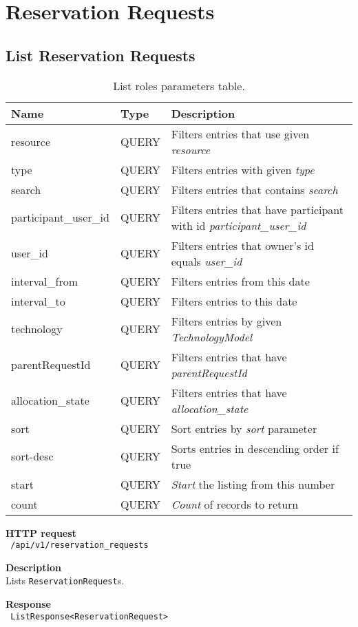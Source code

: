 \section{Reservation Requests}
\subsection{List Reservation Requests}
\begin{table}[ht!]
    \begin{tabularx}{\textwidth}{llX}
        \toprule
        Name & Type & Description \\
        \midrule
        resource & QUERY & Filters entries that use given \emph{resource} \\
        type & QUERY & Filters entries with given \emph{type} \\
        search & QUERY & Filters entries that contains \emph{search} \\
        participant\_user\_id & QUERY &  Filters entries that have participant with id \emph{participant\_user\_id} \\
        user\_id & QUERY & Filters entries that owner's id equals \emph{user\_id} \\
        interval\_from & QUERY & Filters entries from this date \\  
        interval\_to & QUERY & Filters entries to this date \\
        technology & QUERY & Filters entries by given \emph{TechnologyModel} \\
        parentRequestId & QUERY & Filters entries that have \emph{parentRequestId} \\
        allocation\_state & QUERY & Filters entries that have \emph{allocation\_state} \\
        sort & QUERY & Sort entries by \emph{sort} parameter \\
        sort-desc & QUERY & Sorts entries in descending order if true \\
        start & QUERY & \emph{Start} the listing from this number \\  
        count & QUERY & \emph{Count} of records to return
        \end{tabularx}
    \caption{List roles parameters table.}
\end{table}
\begin{description}
    \item \textbf{HTTP request}\\
        \texttt{\text{[GET]} /api/v1/reservation\_requests}
    \item \textbf{Description}\\
        Lists \texttt{ReservationRequest}s.
    \item \textbf{Response}\\
        \texttt{\text{[200 OK]} ListResponse<ReservationRequest>}
\end{description}

